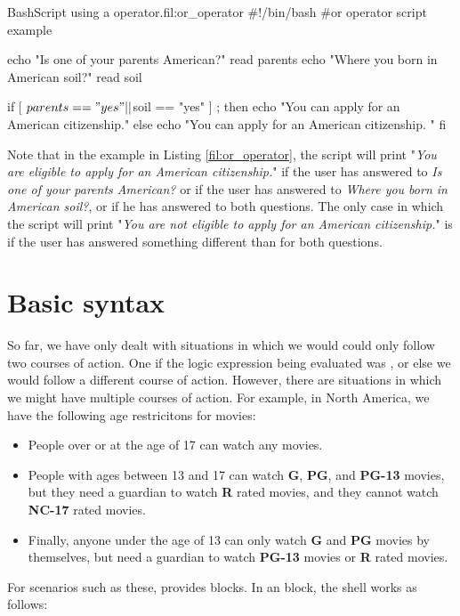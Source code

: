 \begin{source_code_float}{Bash}{Script using a \mycommand{||} operator.}{fil:or_operator}
#!/bin/bash
#or operator script example

echo "Is one of your parents American?"
read parents
echo "Where you born in American soil?"
read soil

if [ $parents == "yes" || $soil == "yes" ] ; then
    echo "You can apply for an American citizenship."   
else
    echo "You can apply for an American citizenship. "   
fi
\end{source_code_float}
Note that in the example in Listing \ref{fil:or_operator}, the script will print "\textit{You are eligible to apply for an American citizenship.}" if the user has answered  to \textit{ Is one of your parents American?} or if the user has answered  to \textit{ Where you born in American soil?}, or if he has answered  to both questions. The only case in which the script will print "\textit{You are not eligible to apply for an American citizenship.}" is if the user has answered something different than  for both questions.


\section{Basic  syntax}

So far, we have only dealt with situations in which we would could only follow two courses of action. One if the logic expression being evaluated was , or else we would follow a different course of action. However, there are situations in which we might have multiple courses of action. For example, in North America, we have the following age restricitons for movies:
\begin{itemize}
\item People over or at the age of 17 can watch any movies. 
\item People with ages between 13 and 17 can watch \textbf{G}, \textbf{PG}, and \textbf{PG-13} movies, but they need a guardian to watch \textbf{R} rated movies, and they cannot watch \textbf{NC-17} rated movies. 
\item Finally, anyone under the age of 13 can only watch \textbf{G} and \textbf{PG} movies by themselves, but need a guardian to watch \textbf{PG-13} movies or \textbf{R} rated movies. 
\end{itemize}
For scenarios such as these,  provides  blocks. In an  block, the shell works as follows:

